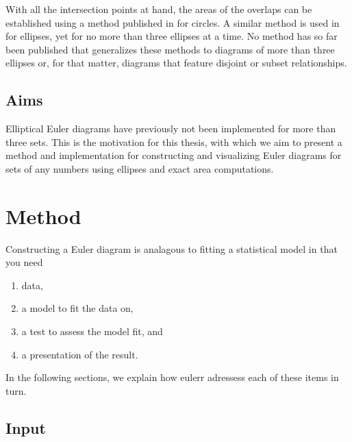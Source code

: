 \documentclass[
  oneside,
  usegeometry,
  numbers=noendperiod,
  openany,
  parskip=half
]{scrbook}\usepackage[]{graphicx}\usepackage{xcolor}
\newcommand{\pkg}[1]{{\fontseries{b}\selectfont #1}}
\begin{document}
With all the intersection points at hand, the areas of the overlaps can be established using a method published in \citet{frederickson_2013} for circles. A similar method is used in \citet{micallef_2013} for ellipses, yet for no more than three ellipses at a time. No method has so far been published that generalizes these methods to diagrams of more than three ellipses or, for that matter, diagrams that feature disjoint or subset relationships.

\section{Aims}
\label{sec:aims}

Elliptical Euler diagrams have previously not been implemented for more than three sets. This is the motivation for this thesis, with which we aim to present a method and implementation for constructing and visualizing Euler diagrams for sets of any numbers using ellipses and exact area computations.

\chapter{Method}
\label{ch:method}

Constructing a Euler diagram is analagous to fitting a statistical model in that you need
\begin{enumerate}
\item data,
\item a model to fit the data on,
\item a test to assess the model fit, and
\item a presentation of the result.
\end{enumerate}
In the following sections, we explain how \pkg{eulerr} adressess each of these items in turn.

\section{Input}
\label{sec:input}
\end{document}
